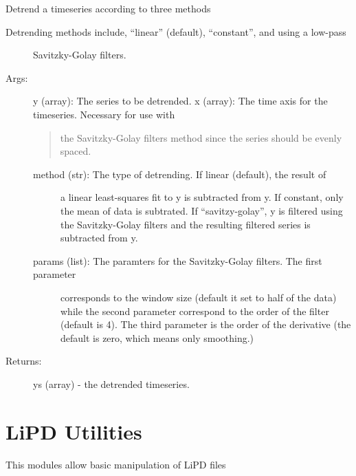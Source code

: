 \documentclass[letterpaper,10pt,english]{sphinxmanual}
\begin{document}

\begin{fulllineitems}
\label{\detokenize{Timeseries:pyleoclim.Timeseries.detrend}}
Detrend a timeseries according to three methods
\begin{description}
\item[{Detrending methods include, “linear” (default), “constant”, and using a low-pass}] \leavevmode
Savitzky-Golay filters.

\item[{Args:}] \leavevmode
y (array): The series to be detrended.
x (array): The time axis for the timeseries. Necessary for use with
\begin{quote}

the Savitzky-Golay filters method since the series should be evenly spaced.
\end{quote}
\begin{description}
\item[{method (str): The type of detrending. If linear (default), the result of}] \leavevmode
a linear least-squares fit to y is subtracted from y. If constant,
only the mean of data is subtrated. If “savitzy-golay”, y is filtered
using the Savitzky-Golay filters and the resulting filtered series
is subtracted from y.

\item[{params (list): The paramters for the Savitzky-Golay filters. The first parameter}] \leavevmode
corresponds to the window size (default it set to half of the data)
while the second parameter correspond to the order of the filter
(default is 4). The third parameter is the order of the derivative
(the default is zero, which means only smoothing.)

\end{description}

\item[{Returns:}] \leavevmode
ys (array) - the detrended timeseries.

\end{description}

\end{fulllineitems}



\chapter{LiPD Utilities}
\label{\detokenize{LIPDutils:lipd-utilities}}\label{\detokenize{LIPDutils::doc}}
This modules allow basic manipulation of LiPD files
\end{document}
